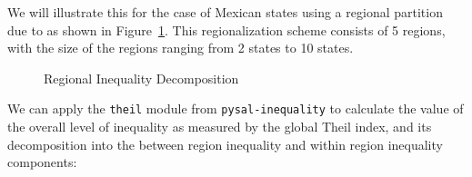 \documentclass[
  a4paper, 
  twoside,
  final
]{article}
\begin{document}
We will illustrate this for the case of Mexican states using a regional
partition due to \citet{hanson1996MexicoIntegration} as shown in
Figure~\ref{fig-components}. This regionalization scheme consists of 5
regions, with the size of the regions ranging from 2 states to 10
states.

\begin{figure}


\caption{\label{fig-components}Regional Inequality Decomposition}

\end{figure}%

We can apply the \texttt{theil} module from \texttt{pysal-inequality} to
calculate the value of the overall level of inequality as measured by
the global Theil index, and its decomposition into the between region
inequality and within region inequality components:
\end{document}
